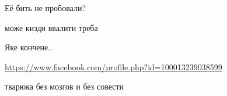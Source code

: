 \begin{itemize}
Её бить не пробовали?

\begin{itemize} %
 
може кизди ввалити треба
\end{itemize} %


 
Яке кончене..

\url{https://www.facebook.com/profile.php?id=100013239038599}\par
 
тварюка без мозгов и без совести

\end{itemize} %

